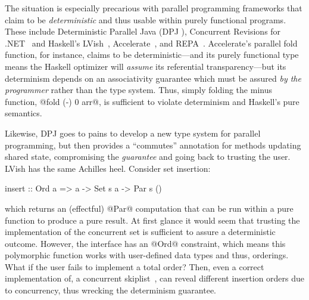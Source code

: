 The situation is especially precarious with parallel
programming frameworks that claim to be \emph{deterministic}
and thus usable within purely functional programs.
These include Deterministic Parallel Java (DPJ \cite{DPJ}),
Concurrent Revisions for .NET~\cite{concurrent-revisions-oopsla}
and Haskell's LVish~\cite{kuper2014freeze},
Accelerate~\cite{accelerate-icfp13},
and REPA~\cite{repa-icfp10}.
%
Accelerate's parallel fold function, for instance,
claims to be deterministic---and its purely functional
type means the Haskell optimizer will \emph{assume}
its referential transparency---but its determinism
depends on an associativity guarantee which must
be assured \emph{by the programmer} rather than
the type system.
%
Thus, simply folding the minus function, @fold (-) 0 arr@,
is sufficient to violate determinism and Haskell's pure semantics.

Likewise, DPJ goes to pains to develop a new type
system for parallel programming, but then provides
a ``commutes'' annotation for methods updating shared
state, compromising the \emph{guarantee} and going
back to trusting the user.
%
LVish has the same Achilles heel. Consider set insertion:
%
\begin{code}
  insert :: Ord a => a -> Set s a -> Par s ()
\end{code}
%
which returns an (effectful) @Par@ computation that can be
run within a pure function to produce a pure result.
%
At first glance it would seem that trusting the implementation of the
concurrent set is sufficient to assure a deterministic outcome.
%
However, the interface has an @Ord@ constraint, which means
this polymorphic function works with user-defined data types
and thus, orderings.
%
What if the user fails to implement a total order?
%
Then, even a correct implementation of, \eg a concurrent
skiplist~\cite{concurrent-skiplist}, can reveal different
insertion orders due to concurrency, thus wrecking the
determinism guarantee.




